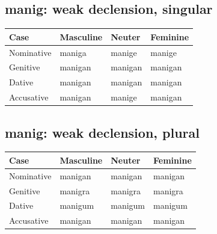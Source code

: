 \subsection*{manig: weak declension, singular}

\par\begingroup
\fontsize{10.5}{13.2}\selectfont
\setlength{\LTleft}{0pt}\setlength{\LTright}{\fill}
\noindent
\begin{tabular}{@{}>{\raggedright\arraybackslash}p{28.89mm}>{\raggedright\arraybackslash}p{28.89mm}>{\raggedright\arraybackslash}p{28.89mm}>{\raggedright\arraybackslash}p{28.89mm}@{}}
\toprule
\textbf{Case} & \textbf{Masculine} & \textbf{Neuter} & \textbf{Feminine} \\
\midrule
Nominative & maniga & manige & manige \\
Genitive & manigan & manigan & manigan \\
Dative & manigan & manigan & manigan \\
Accusative & manigan & manige & manigan \\
\bottomrule
\end{tabular}
\par\endgroup

\subsection*{manig: weak declension, plural}

\par\begingroup
\fontsize{10.5}{13.2}\selectfont
\setlength{\LTleft}{0pt}\setlength{\LTright}{\fill}
\noindent
\begin{tabular}{@{}>{\raggedright\arraybackslash}p{28.89mm}>{\raggedright\arraybackslash}p{28.89mm}>{\raggedright\arraybackslash}p{28.89mm}>{\raggedright\arraybackslash}p{28.89mm}@{}}
\toprule
\textbf{Case} & \textbf{Masculine} & \textbf{Neuter} & \textbf{Feminine} \\
\midrule
Nominative & manigan & manigan & manigan \\
Genitive & manigra & manigra & manigra \\
Dative & manigum & manigum & manigum \\
Accusative & manigan & manigan & manigan \\
\bottomrule
\end{tabular}
\par\endgroup

